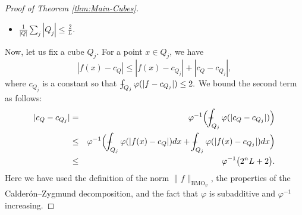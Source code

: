 \documentclass[11pt,a4paper]{amsart}
\theoremstyle{definition}
\theoremstyle{remark}
\numberwithin{equation}{section}
\DeclareMathOperator{\BMO}{BMO}
\def\Xint#1{\mathchoice
  {\XXint\displaystyle\textstyle{#1}}%
  {\XXint\textstyle\scriptstyle{#1}}%
  {\XXint\scriptstyle\scriptscriptstyle{#1}}%
  {\XXint\scriptscriptstyle\scriptscriptstyle{#1}}%
  \!\int}
\def\XXint#1#2#3{{\setbox0=\hbox{$#1{#2#3}{\int}$}
    \vcenter{\hbox{$#2#3$}}\kern-.5\wd0}}
\def\avgint{\Xint-}
\numberwithin{equation}{section}
\begin{document}
\begin{proof}[Proof of Theorem \ref{thm:Main-Cubes}]
\begin{itemize}
\item $\displaystyle\frac{1}{|Q|}\sum_j |Q_j| \leq \frac{2}{L}.$
\end{itemize}
Now, let us fix a cube $Q_j$. For a point $x\in Q_j$, we have
%
\[
|f(x)-c_Q|\leq |f(x)-c_{Q_j}| + |c_Q-c_{Q_j}|,
\]
where $c_{Q_j}$ is a constant so that $\avgint_{Q_j}\varphi(|f-c_{Q_j}|)\leq 2.$ We bound the second term as follows:
%
\begin{eqnarray*}
|c_Q-c_{Q_j}| & = &\varphi^{-1} \Big( \avgint_{Q_j} \varphi(|c_Q-c_{Q_j}|)\Big) \\
%
& \leq &\varphi^{-1} \Big( \avgint_{Q_j} \varphi(|f(x) -c_Q|) dx + \avgint_{Q_j}\varphi(|f(x)-c_{Q_j}|)dx\Big) \\
%
& \leq & \varphi^{-1} \big( 2^n L +2 \big).
\end{eqnarray*}
Here we have used the definition of the norm $\|f\|_{\BMO_\varphi}$, the properties of the Calder\'on--Zygmund decomposition, and the fact that $\varphi$ is subadditive and $\varphi^{-1}$ increasing.



\end{proof}
\end{document}
